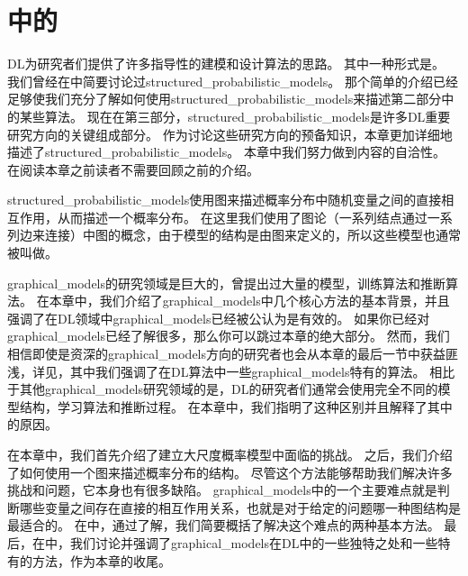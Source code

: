 \chapter{中的}
\label{chap:structured_probabilistic_models_for_deep_learning}


\gls{DL}为研究者们提供了许多指导性的建模和设计算法的思路。
其中一种形式是。
我们曾经在中简要讨论过\gls{structured_probabilistic_models}。
那个简单的介绍已经足够使我们充分了解如何使用\gls{structured_probabilistic_models}来描述第二部分中的某些算法。
现在在第三部分，\gls{structured_probabilistic_models}是许多\gls{DL}重要研究方向的关键组成部分。
作为讨论这些研究方向的预备知识，本章更加详细地描述了\gls{structured_probabilistic_models}。
本章中我们努力做到内容的自洽性。
在阅读本章之前读者不需要回顾之前的介绍。


\gls{structured_probabilistic_models}使用图来描述概率分布中随机变量之间的直接相互作用，从而描述一个概率分布。
在这里我们使用了图论（一系列结点通过一系列边来连接）中图的概念，由于模型的结构是由图来定义的，所以这些模型也通常被叫做。


\gls{graphical_models}的研究领域是巨大的，曾提出过大量的模型，训练算法和推断算法。
在本章中，我们介绍了\gls{graphical_models}中几个核心方法的基本背景，并且强调了在\gls{DL}领域中\gls{graphical_models}已经被公认为是有效的。
如果你已经对\gls{graphical_models}已经了解很多，那么你可以跳过本章的绝大部分。
然而，我们相信即使是资深的\gls{graphical_models}方向的研究者也会从本章的最后一节中获益匪浅，详见，其中我们强调了在\gls{DL}算法中一些\gls{graphical_models}特有的算法。
相比于其他\gls{graphical_models}研究领域的是，\gls{DL}的研究者们通常会使用完全不同的模型结构，学习算法和推断过程。
在本章中，我们指明了这种区别并且解释了其中的原因。


在本章中，我们首先介绍了建立大尺度概率模型中面临的挑战。
之后，我们介绍了如何使用一个图来描述概率分布的结构。
尽管这个方法能够帮助我们解决许多挑战和问题，它本身也有很多缺陷。
\gls{graphical_models}中的一个主要难点就是判断哪些变量之间存在直接的相互作用关系，也就是对于给定的问题哪一种图结构是最适合的。
在中，通过了解，我们简要概括了解决这个难点的两种基本方法。
最后，在中，我们讨论并强调了\gls{graphical_models}在\gls{DL}中的一些独特之处和一些特有的方法，作为本章的收尾。




